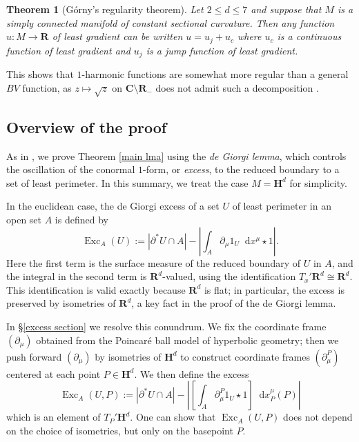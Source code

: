 \documentclass[final,12pt, leqno]{brownthesis}
\newcommand{\RR}{\mathbf{R}}
\newcommand{\CC}{\mathbf{C}}
\newcommand{\Hyp}{\mathbf H}
\DeclareMathOperator{\Exc}{Exc}
\newcommand*\dif{\mathop{}\!\mathrm{d}}
\newcommand{\dfn}[1]{\emph{#1}\index{#1}}
\newtheorem{theorem}{Theorem}[section]
\theoremstyle{definition}
\numberwithin{equation}{section}
\begin{document}
\begin{theorem}[G\'orny's regularity theorem]
Let $2 \leq d \leq 7$ and suppose that $M$ is a simply connected manifold of constant sectional curvature.
Then any function $u: M \to \RR$ of least gradient can be written $u = u_j + u_c$ where $u_c$ is a continuous function of least gradient and $u_j$ is a jump function of least gradient.
\end{theorem}

This shows that $1$-harmonic functions are somewhat more regular than a general $BV$ function, as $z \mapsto \sqrt z$ on $\CC \setminus \RR_-$ does not admit such a decomposition \cite[Example 4.1]{Ambrosio2000FunctionsOB}.


\subsection{Overview of the proof}
As in \cite{Miranda66, Giusti77}, we prove Theorem \ref{main lma} using the \dfn{de Giorgi lemma}, which controls the oscillation of the conormal $1$-form, or \dfn{excess}, to the reduced boundary to a set of least perimeter.
In this summary, we treat the case $M = \Hyp^d$ for simplicity.

In the euclidean case, the de Giorgi excess of a set $U$ of least perimeter in an open set $A$ is defined by
$$\Exc_A(U) := |\partial^* U \cap A| - \left|\int_A \partial_\mu 1_U \dif x^\mu \star 1\right|.$$
Here the first term is the surface measure of the reduced boundary of $U$ in $A$, and the integral in the second term is $\RR^d$-valued, using the identification $T_x'\RR^d \cong \RR^d$.
This identification is valid exactly because $\RR^d$ is flat; in particular, the excess is preserved by isometries of $\RR^d$, a key fact in the proof of the de Giorgi lemma.

In \S\ref{excess section} we resolve this conundrum.
We fix the coordinate frame $(\partial_\mu)$ obtained from the Poincar\'e ball model of hyperbolic geometry; then we push forward $(\partial_\mu)$ by isometries of $\Hyp^d$ to construct coordinate frames $(\partial_\mu^P)$ centered at each point $P \in \Hyp^d$.
We then define the excess
\begin{equation}\label{excess definition prelim}
\Exc_A(U, P) := |\partial^* U \cap A| - \left|\left[\int_A \partial_\mu^P 1_U \star 1\right] \dif x^\mu_P(P)\right|
\end{equation}
which is an element of $T_P' \Hyp^d$.
One can show that $\Exc_A(U, P)$ does not depend on the choice of isometries, but only on the basepoint $P$.
\end{document}

